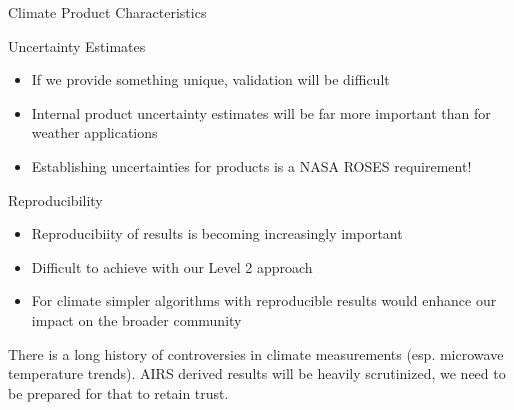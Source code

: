 \documentclass[10pt,t]{beamer}
\begin{document}
\begin{frame}[label={sec:org061aadb},shrink=5]{Climate Product Characteristics}
\begin{block}{Uncertainty Estimates}
\begin{itemize}
\item If we provide something unique, validation will be difficult
\item Internal product uncertainty estimates will be far more important than for weather applications
\item Establishing uncertainties for products is a NASA ROSES requirement!
\end{itemize}
\end{block}

\begin{block}{Reproducibility}
\begin{itemize}
\item Reproducibiity of results is becoming increasingly important
\item Difficult to achieve with our Level 2 approach
\item For climate simpler algorithms with reproducible results would enhance our impact on the broader community
\end{itemize}

There is a long history of controversies in climate measurements (esp. microwave temperature trends).  AIRS derived results will be heavily scrutinized, we need to be prepared for that to retain trust.
\end{block}
\end{frame}
\end{document}
